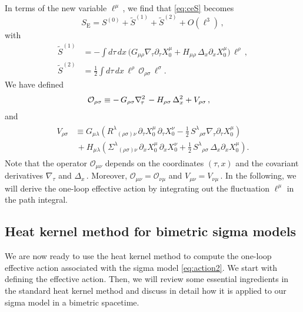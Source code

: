 \documentclass[11pt]{article}
\newcommand{\be}{\begin{equation}}
\newcommand{\ee}{\end{equation}}
\newcommand{\CO}{\mathcal{O}}
\newcommand{\lr}{\left (}
\newcommand{\rr}{\right )}
\newcommand{\p}{\partial}
\renewcommand{\tilde}[1]{\widetilde{#1}}
\begin{document}
In terms of the new variable $\ell^\mu$\,, we find that \eqref{eq:ceS} becomes
%
\be \label{eq:ceaction}
	S_\text{E} = S^{(0)} + \tilde{S}^{(1)} + \tilde{S}^{(2)} + O(\ell^3)\,, 
\ee
%
with
%
\begin{subequations}
\begin{align}
	\tilde{S}^{(1)} & = - \int d\tau \, dx \, \bigl( G_{\mu\rho} \nabla_{\!\tau} \p_\tau X_0^\mu + H_{\mu\rho} \, \Delta_x \p_x X_0^\mu \bigr) \, \ell^\rho\,, \\[2pt]
	\tilde{S}^{(2)} & = \frac{1}{2} \int d\tau \, dx \, \ell^\rho \, \CO_{\rho\sigma} \, \ell^\sigma\!.
\end{align}
\end{subequations}
%
We have defined
%
\begin{align} \label{eq:defO}
\begin{split}
	\CO_{\rho\sigma} & \equiv - \, G_{\rho\sigma} \nabla_{\!\tau}^2 \hspace{0.5mm} - H_{\rho\sigma} \, \Delta_x^2 + V_{\rho\sigma}\,,
\end{split}
\end{align}
%
and
%
\begin{align} \label{eq:defV}
\begin{split}
	V_{\rho\sigma} & \equiv G_{\mu\lambda} \lr R^\lambda{}_{(\rho\sigma)\nu} \, \p_\tau X_0^\mu \, \p_\tau X_0^\nu - \tfrac{1}{2} \, S^\lambda{}_{\rho\sigma} \nabla_{\!\tau} \p_\tau X_0^\mu \rr \\[4pt]
	& \, + H_{\mu\lambda} \lr \Sigma^\lambda{}_{(\rho\sigma)\nu} \, \p_x X_0^\mu \, \p_x X_0^\nu + \tfrac{1}{2} \, S^\lambda{}_{\rho\sigma} \, \Delta_x \p_x X_0^\mu \rr.
\end{split}
\end{align}
%
Note that the operator $\CO_{\mu\nu}$ depends on the coordinates $(\tau, x)$ and the covariant derivatives $\nabla_{\!\tau}$ and $\Delta_x$\,. Moreover, $\CO_{\mu\nu} = \CO_{\nu\mu}$ and $V_{\mu\nu} = V_{\nu\mu}$\,. In the following, we will derive the one-loop effective action by integrating out the fluctuation $\ell^\mu$ in the path integral.  

\subsection{Heat kernel method for bimetric sigma models}

We are now ready to use the heat kernel method to compute the one-loop effective action associated with the sigma model \eqref{eq:action2}. We start with defining the effective action. Then, we will review some essential ingredients in the standard heat kernel method \cite{seeley1967complex, Gilkey:1975iq, Gusynin:1989ky} and discuss in detail how it is applied to our sigma model in a bimetric spacetime. 
\end{document}
